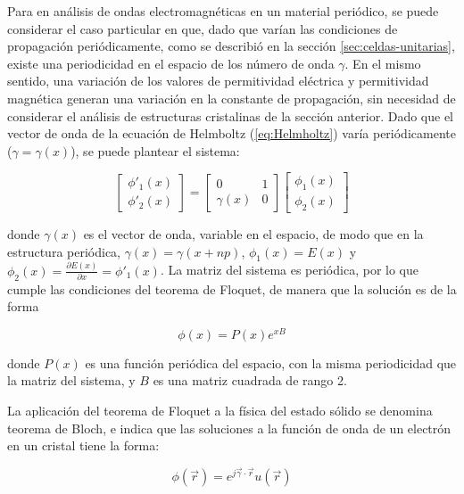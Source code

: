Para en análisis de ondas electromagnéticas en un material periódico, se puede considerar el caso particular en que, dado que varían las condiciones de propagación periódicamente, como se describió en la sección \ref{sec:celdas-unitarias}, existe una periodicidad en el espacio de los número de onda $\gamma$. En el mismo sentido, una variación de los valores de permitividad eléctrica y permitividad magnética generan una variación en la constante de propagación, sin necesidad de considerar el análisis de estructuras cristalinas de la sección anterior. Dado que el vector de onda de la ecuación de Helmboltz (\ref{eq:Helmholtz}) varía periódicamente ($\gamma = \gamma(x)$), se puede plantear el sistema:

\begin{equation}
	\begin{bmatrix}
		\phi'_1(x) \\
		\phi'_2(x)
	\end{bmatrix}
	=
	\begin{bmatrix}
		0 & 1 \\
		\gamma(x) & 0
	\end{bmatrix}
	\begin{bmatrix}
		\phi_1(x) \\
		\phi_2(x)
	\end{bmatrix}
\end{equation}

donde $\gamma(x)$ es el vector de onda, variable en el espacio, de modo que en la estructura periódica, $\gamma(x) = \gamma(x+n p)$, $\phi_1(x) = E(x)$ y $\phi_2(x) = \frac{\partial E(x)}{\partial x} = \phi'_1(x)$. La matriz del sistema es periódica, por lo que cumple las condiciones del teorema de Floquet, de manera que la solución es de la forma

\begin{equation}
	\phi(x) = P(x) e^{xB}
\end{equation}

donde $P(x)$ es una función periódica del espacio, con la misma periodicidad que la matriz del sistema, y $B$ es una matriz cuadrada de rango 2.

La aplicación del teorema de Floquet a la física del estado sólido se denomina teorema de Bloch, e indica que las soluciones a la función de onda de un electrón en un cristal tiene la forma:

\begin{equation}
\phi(\vec{r}) = e^{j\vec{\gamma} \cdot \vec{r}} u(\vec{r})
\end{equation}

